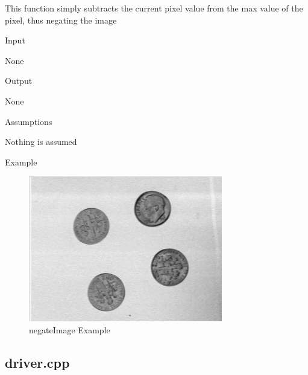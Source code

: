 \documentclass[pdftex, 11pt]{article}
\begin{document}
\begin{description}
\begin{description}
				This function simply subtracts the current pixel
				value from the max value of
				the pixel, thus negating the image

			\item{Input}

				None

			\item{Output}

				None

			\item{Assumptions}

				Nothing is assumed

			\item{Example}

				\begin{figure}[h]
					\centering
					\caption{negateImage Example}
				\includegraphics{images/outnegative.png}
			\end{figure}

		\end{description}


\end{description}

\subsection{driver.cpp}
\end{document}
